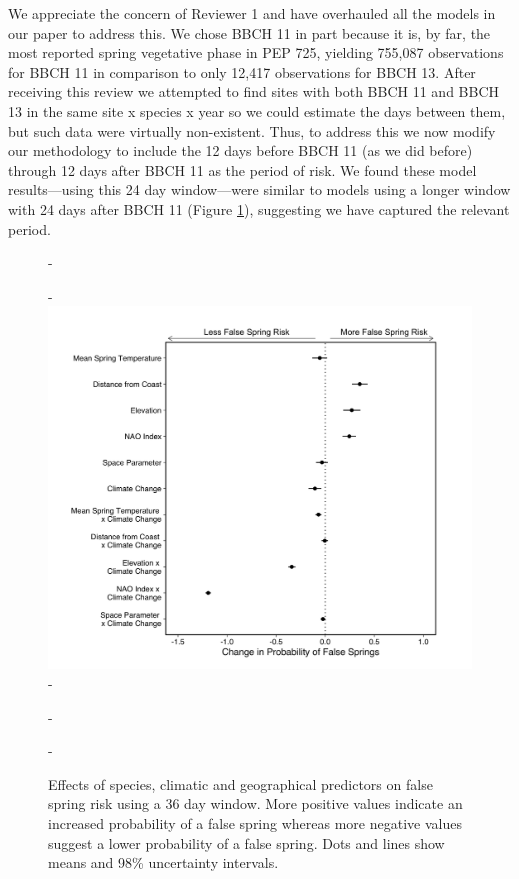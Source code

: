 \documentclass[11pt,a4paper]{article}\usepackage[]{graphicx}\usepackage[]{color}
\begin{document}
We appreciate the concern of Reviewer 1 and have overhauled all the models in our paper to address this. We chose BBCH 11 in part because it is, by far, the most reported spring vegetative phase in PEP 725, yielding 755,087 observations for BBCH 11 in comparison to only 12,417 observations for BBCH 13. After receiving this review we attempted to find sites with both BBCH 11 and BBCH 13 in the same site x species x year so we could estimate the days between them, but such data were virtually non-existent. Thus, to address this we now modify our methodology to include the 12 days before BBCH 11 (as we did before) through 12 days after BBCH 11 as the period of risk. We found these model results---using this 24 day window---were similar to models using a longer window with 24 days after BBCH 11 (Figure \ref{fig:spp}), suggesting we have captured the relevant period.\\ 

{\begin{figure} [H]
  -\begin{center}
  -\includegraphics[width=12cm]{..//..//analyses/figures/model_output_98_verylong.png}
  -\caption{Effects of species, climatic and geographical predictors on false spring risk using a 36 day window. More positive values indicate an increased probability of a false spring whereas more negative values suggest a lower probability of a false spring. Dots and lines show means and 98\% uncertainty intervals.}\label{fig:spp}
  -\end{center}
  -\end{figure}}
\end{document}
